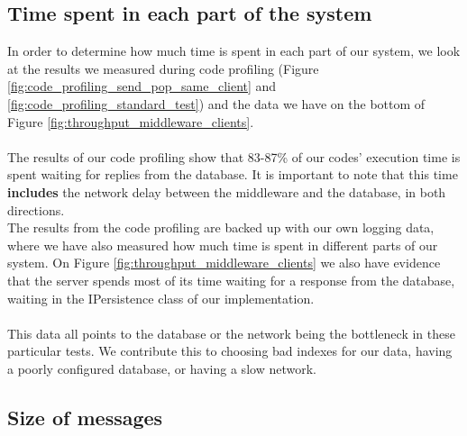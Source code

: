 \documentclass{article}
\begin{document}
        \subsection{Time spent in each part of the system}
            \label{sec:time_spent_in_each_part_of_the_system}
            In order to determine how much time is spent in each part of our system, we look at the results we measured during code profiling (Figure \ref{fig:code_profiling_send_pop_same_client} and \ref{fig:code_profiling_standard_test}) and the data we have on the bottom of Figure \ref{fig:throughput_middleware_clients}.\\
            \\
            The results of our code profiling show that 83-87\% of our codes' execution time is spent waiting for replies from the database. It is important to note that this time \textbf{includes} the network delay between the middleware and the database, in both directions.\\
            The results from the code profiling are backed up with our own logging data, where we have also measured how much time is spent in different parts of our system. On Figure \ref{fig:throughput_middleware_clients} we also have evidence that the server spends most of its time waiting for a response from the database, waiting in the IPersistence class of our implementation.\\
            \\
            This data all points to the database or the network being the bottleneck in these particular tests. We contribute this to choosing bad indexes for our data, having a poorly configured database, or having a slow network.


        \subsection{Size of messages}
\end{document}
